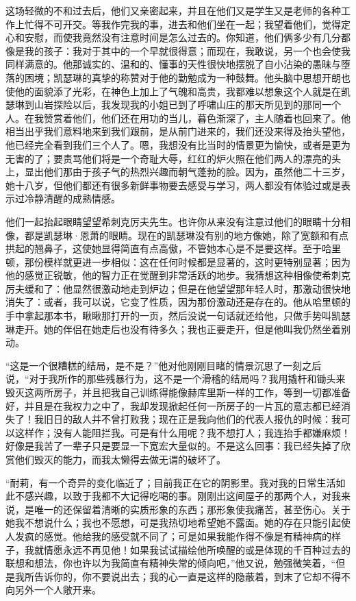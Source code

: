 \par 这场轻微的不和过去后，他们又亲密起来，并且在他们又是学生又是老师的各种工作上忙得不可开交。等我作完我的事，进去和他们坐在一起；我望着他们，觉得定心和安慰，而使我竟然没有注意时间是怎么过去的。你知道，他们俩多少有几分都像是我的孩子：我对于其中的一个早就很得意；而现在，我敢说，另一个也会使我同样满意的。他那诚实的、温和的、懂事的天性很快地摆脱了自小沾染的愚昧与堕落的困境；凯瑟琳的真挚的称赞对于他的勤勉成为一种鼓舞。他头脑中思想开朗也使他的面貌添了光彩，在神色上加上了气魄和高贵，我都难以想象这个人就是在凯瑟琳到山岩探险以后，我发现我的小姐已到了呼啸山庄的那天所见到的那同一个人。在我赞赏着他们，他们还在用功的当儿，暮色渐深了，主人随着也回来了。他相当出乎我们意料地来到我们跟前，是从前门进来的，我们还没来得及抬头望他，他已经完全看到我们三个人了。嗯，我想没有比当时的情景更为愉快，或者是更为无害的了；要责骂他们将是一个奇耻大辱，红红的炉火照在他们两人的漂亮的头上，显出他们那由于孩子气的热烈兴趣而朝气蓬勃的脸。因为，虽然他二十三岁，她十八岁，但他们都还有很多新鲜事物要去感受与学习，两人都没有体验过或是表示过冷静清醒的成熟情感。
\par 他们一起抬起眼睛望望希刺克厉夫先生。也许你从来没有注意过他们的眼睛十分相像，都是凯瑟琳·恩萧的眼睛。现在的凯瑟琳没有别的地方像她，除了宽额和有点拱起的翘鼻子，这使她显得简直有点高傲，不管她本心是不是要这样。至于哈里顿，那份模样就更进一步相似：这在任何时候都是显著的，这时更特别显著；因为他的感觉正锐敏，他的智力正在觉醒到非常活跃的地步。我猜想这种相像使希刺克厉夫缓和了：他显然很激动地走到炉边；但是在他望望那年轻人时，那激动很快地消失了：或者，我可以说，它变了性质，因为那份激动还是存在的。他从哈里顿的手中拿起那本书，瞅瞅那打开的一页，然后没说一句话就还给他，只做手势叫凯瑟琳走开。她的伴侣在她走后也没有待多久；我也正要走开，但是他叫我仍然坐着别动。
\par “这是一个很糟糕的结局，是不是？”他对他刚刚目睹的情景沉思了一刻之后说，“对于我所作的那些残暴行为，这不是一个滑稽的结局吗？我用撬杆和锄头来毁灭这两所房子，并且把我自己训练得能像赫库里斯一样的工作，等到一切都准备好，并且是在我权力之中了，我却发现掀起任何一所房子的一片瓦的意志都已经消失了！我旧日的敌人并不曾打败我；现在正是我向他们的代表人报仇的时候：我可以这样作；没有人能阻拦我。可是有什么用呢？我不想打人；我连抬手都嫌麻烦！好像是我苦了一辈子只是要显一下宽宏大量似的。不是这么回事：我已经失掉了欣赏他们毁灭的能力，而我太懒得去做无谓的破坏了。
\par “耐莉，有一个奇异的变化临近了；目前我正在它的阴影里。我对我的日常生活如此不感兴趣，以致于我都不大记得吃喝的事。刚刚出这间屋子的那两个人，对我来说，是唯一的还保留着清晰的实质形象的东西；那形象使我痛苦，甚至伤心。关于她我不想说什么；我也不愿想，可是我热切地希望她不露面。她的存在只能引起使人发疯的感觉。他给我的感受就不同了；可是如果我能作得不像是有精神病的样子，我就情愿永远不再见他！如果我试试描绘他所唤醒的或是体现的千百种过去的联想和想法，你也许以为我简直有精神失常的倾向吧，”他又说，勉强微笑着，“但是我所告诉你的，你不要说出去；我的心一直是这样的隐蔽着，到末了它却不得不向另外一个人敞开来。
